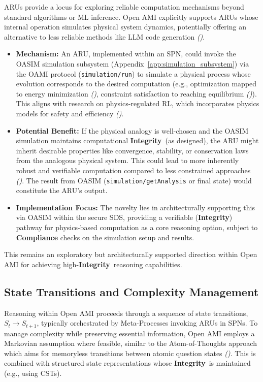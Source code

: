 \documentclass[12pt,a4paper]{report}
\renewcommand{\citep}[1]{\textit{\scriptsize{(\cite{#1})}}}
\newcommand{\Integrity}{\textbf{Integrity}}
\begin{document}
	ARUs provide a locus for exploring reliable computation mechanisms beyond standard algorithms or ML inference. Open AMI explicitly supports ARUs whose internal operation simulates physical system dynamics, potentially offering an alternative to less reliable methods like LLM code generation \citep{AdditionalCitationRef14}.
	\begin{itemize}
		\item \textbf{Mechanism:} An ARU, implemented within an SPN, could invoke the OASIM simulation subsystem (Appendix~\ref{app:simulation_subsystem}) via the OAMI protocol (\texttt{simulation/run}) to simulate a physical process whose evolution corresponds to the desired computation (e.g., optimization mapped to energy minimization \citep{Physics-InspiredReasoning_Ref14}, constraint satisfaction to reaching equilibrium \citep{Physics-InspiredReasoning_Ref17}). This aligns with research on physics-regulated RL, which incorporates physics models for safety and efficiency \citep{Cao_PhyDRL_2024}.
		\item \textbf{Potential Benefit:} If the physical analogy is well-chosen and the OASIM simulation maintains computational \Integrity\ (as designed), the ARU might inherit desirable properties like convergence, stability, or conservation laws from the analogous physical system. This could lead to more inherently robust and verifiable computation compared to less constrained approaches \citep{Physics-InspiredReasoning_Ref13}. The result from OASIM (\texttt{simulation/getAnalysis} or final state) would constitute the ARU's output.
		\item \textbf{Implementation Focus:} The novelty lies in architecturally supporting this via OASIM within the secure SDS, providing a verifiable (\Integrity) pathway for physics-based computation as a core reasoning option, subject to \textbf{Compliance} checks on the simulation setup and results.
	\end{itemize}
	This remains an exploratory but architecturally supported direction within Open AMI for achieving high-\Integrity\ reasoning capabilities.
	
	\subsection{State Transitions and Complexity Management}
	\label{sec:2-4-3}
	
	Reasoning within Open AMI proceeds through a sequence of state transitions, $S_t \rightarrow S_{t+1}$, typically orchestrated by Meta-Processes invoking ARUs in SPNs. To manage complexity while preserving essential information, Open AMI employs a Markovian assumption where feasible, similar to the Atom-of-Thoughts approach which aims for memoryless transitions between atomic question states \citep{Teng2025AtomOfThoughtsRef}. This is combined with structured state representations whose \Integrity\ is maintained (e.g., using CSTs).
	
\end{document}
